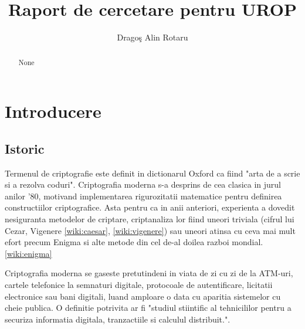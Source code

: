 \documentclass{llncs}
\begin{document}
\pagestyle{empty}
%
%
\title{Raport de cercetare pentru UROP}
%
%
\author{Drago\c{s} Alin Rotaru}
%



\maketitle              %

\begin{abstract}
  None
\end{abstract}


\section{Introducere}
\label{sec:intro}

\subsection{Istoric}
Termenul de criptografie este definit in dictionarul Oxford ca fiind "arta de a scrie si a rezolva coduri".
Criptografia moderna s-a desprins de cea clasica in jurul anilor '80, motivand implementarea rigurozitatii matematice pentru definirea constructiilor criptografice. Asta pentru ca in anii anteriori, experienta a dovedit nesiguranta metodelor de criptare, criptanaliza lor fiind uneori triviala (cifrul lui Cezar, Vigenere \ref{wiki:caesar}, \ref{wiki:vigenere}) sau uneori atinsa cu ceva mai mult efort precum Enigma si alte metode din cel de-al doilea razboi mondial. \ref{wiki:enigma}

Criptografia moderna se gaseste pretutindeni in viata de zi cu zi de la ATM-uri, cartele telefonice la semnaturi digitale, protocoale de autentificare, licitatii electronice sau bani digitali, luand amploare o data cu aparitia sistemelor cu cheie publica. O definitie potrivita ar fi "studiul stiintific al tehnicililor pentru a securiza informatia digitala, tranzactiile si calculul distribuit.". \cite{Katz:2007}
\end{document}
